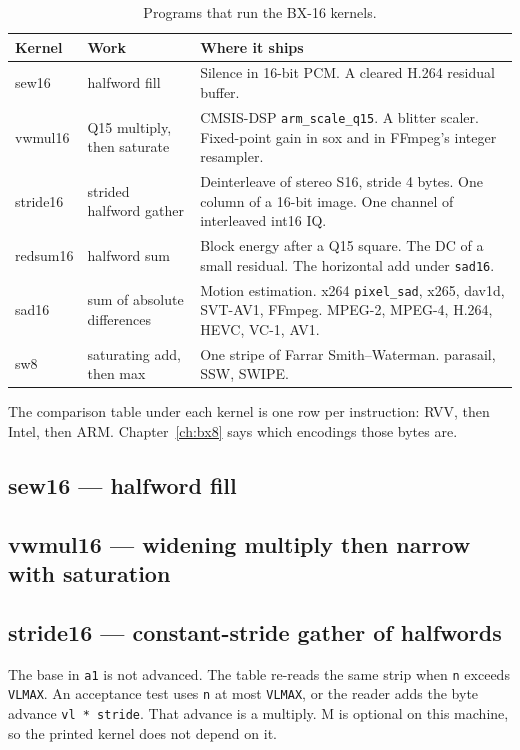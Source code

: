 \begin{table}[htbp]
\centering
\caption{Programs that run the BX-16 kernels.}
\begingroup
\scriptsize
\setlength{\tabcolsep}{3pt}
\begin{tabular}{@{}llp{7.2cm}@{}}
\toprule
Kernel & Work & Where it ships \\
\midrule
sew16 & halfword fill & Silence in 16-bit PCM. A cleared H.264 residual buffer. \\
vwmul16 & Q15 multiply, then saturate & CMSIS-DSP \texttt{arm\_scale\_q15}. A blitter scaler. Fixed-point gain in sox and in FFmpeg's integer resampler. \\
stride16 & strided halfword gather & Deinterleave of stereo S16, stride 4 bytes. One column of a 16-bit image. One channel of interleaved int16 IQ. \\
redsum16 & halfword sum & Block energy after a Q15 square. The DC of a small residual. The horizontal add under \texttt{sad16}. \\
sad16 & sum of absolute differences & Motion estimation. x264 \texttt{pixel\_sad}, x265, dav1d, SVT-AV1, FFmpeg. MPEG-2, MPEG-4, H.264, HEVC, VC-1, AV1. \\
sw8 & saturating add, then max & One stripe of Farrar Smith--Waterman. parasail, SSW, SWIPE. \\
\bottomrule
\end{tabular}
\endgroup
\end{table}

The comparison table under each kernel is one row per instruction: RVV, then Intel, then ARM. Chapter~\ref{ch:bx8} says which encodings those bytes are.

\subsection{sew16 --- halfword fill}


\subsection{vwmul16 --- widening multiply then narrow with saturation}


\subsection{stride16 --- constant-stride gather of halfwords}
The base in \texttt{a1} is not advanced. The table re-reads the same strip when \texttt{n} exceeds \texttt{VLMAX}. An acceptance test uses \texttt{n} at most \texttt{VLMAX}, or the reader adds the byte advance \texttt{vl * stride}. That advance is a multiply. M is optional on this machine, so the printed kernel does not depend on it.

